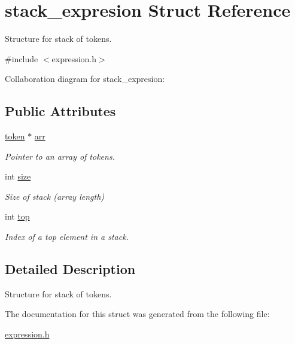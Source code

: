 \hypertarget{structstack__expresion}{}\section{stack\+\_\+expresion Struct Reference}
\label{structstack__expresion}


Structure for stack of tokens.  




{\ttfamily \#include $<$expression.\+h$>$}



Collaboration diagram for stack\+\_\+expresion\+:
\subsection*{Public Attributes}
\begin{DoxyCompactItemize}
\item 
\hyperlink{structtoken}{token} $\ast$ \hyperlink{structstack__expresion_a975af406eb276e2cf4d58928f3aa6cb9}{arr}\hypertarget{structstack__expresion_a975af406eb276e2cf4d58928f3aa6cb9}{}\label{structstack__expresion_a975af406eb276e2cf4d58928f3aa6cb9}

\begin{DoxyCompactList}\small\item\em Pointer to an array of tokens. \end{DoxyCompactList}\item 
int \hyperlink{structstack__expresion_aebb43764c9357a3692570f8ae3de602e}{size}\hypertarget{structstack__expresion_aebb43764c9357a3692570f8ae3de602e}{}\label{structstack__expresion_aebb43764c9357a3692570f8ae3de602e}

\begin{DoxyCompactList}\small\item\em Size of stack (array length) \end{DoxyCompactList}\item 
int \hyperlink{structstack__expresion_afb0f068668196c0ed32494f1307317fb}{top}\hypertarget{structstack__expresion_afb0f068668196c0ed32494f1307317fb}{}\label{structstack__expresion_afb0f068668196c0ed32494f1307317fb}

\begin{DoxyCompactList}\small\item\em Index of a top element in a stack. \end{DoxyCompactList}\end{DoxyCompactItemize}


\subsection{Detailed Description}
Structure for stack of tokens. 

The documentation for this struct was generated from the following file\+:\begin{DoxyCompactItemize}
\item 
\hyperlink{expression_8h}{expression.\+h}\end{DoxyCompactItemize}
